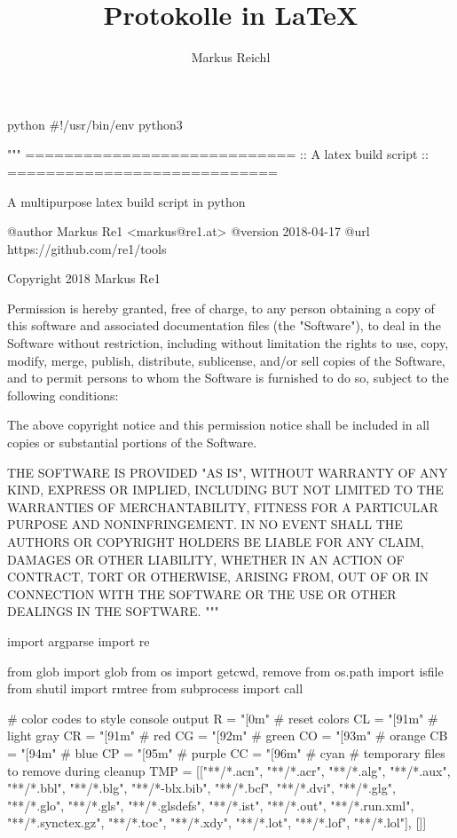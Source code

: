 \documentclass[minted]{protocol}
\title{Protokolle in \LaTeX}
\author{Markus Reichl}
\begin{document}
\begin{code}{python}
#!/usr/bin/env python3

"""
============================
::  A latex build script  ::
============================

A multipurpose latex build script in python

@author     Markus Re1 <markus@re1.at>
@version    2018-04-17
@url        https://github.com/re1/tools


Copyright 2018 Markus Re1

Permission is hereby granted, free of charge, to any person obtaining a copy of this software and
associated documentation files (the "Software"), to deal in the Software without restriction,
including without limitation the rights to use, copy, modify, merge, publish, distribute, sublicense,
and/or sell copies of the Software, and to permit persons to whom the Software is furnished to do so,
subject to the following conditions:

The above copyright notice and this permission notice shall be included in all copies or substantial
portions of the Software.

THE SOFTWARE IS PROVIDED "AS IS", WITHOUT WARRANTY OF ANY KIND, EXPRESS OR IMPLIED, INCLUDING BUT NOT
LIMITED TO THE WARRANTIES OF MERCHANTABILITY, FITNESS FOR A PARTICULAR PURPOSE AND NONINFRINGEMENT.
IN NO EVENT SHALL THE AUTHORS OR COPYRIGHT HOLDERS BE LIABLE FOR ANY CLAIM, DAMAGES OR OTHER LIABILITY,
WHETHER IN AN ACTION OF CONTRACT, TORT OR OTHERWISE, ARISING FROM, OUT OF OR IN CONNECTION WITH THE
SOFTWARE OR THE USE OR OTHER DEALINGS IN THE SOFTWARE.
"""

import argparse
import re

from glob import glob
from os import getcwd, remove
from os.path import isfile
from shutil import rmtree
from subprocess import call

# color codes to style console output
R = "[0m"       # reset colors
CL = "[91m"     # light gray
CR = "[91m"     # red
CG = "[92m"     # green
CO = "[93m"     # orange
CB = "[94m"     # blue
CP = "[95m"     # purple
CC = "[96m"     # cyan
# temporary files to remove during cleanup
TMP = [["**/*.acn", "**/*.acr", "**/*.alg", "**/*.aux", "**/*.bbl", "**/*.blg", "**/*-blx.bib",
        "**/*.bcf", "**/*.dvi", "**/*.glg", "**/*.glo", "**/*.gls", "**/*.glsdefs", "**/*.ist",
        "**/*.out", "**/*.run.xml", "**/*.synctex.gz", "**/*.toc", "**/*.xdy", "**/*.lot",
        "**/*.lof", "**/*.lol"], []]



\end{code}
\end{document}

